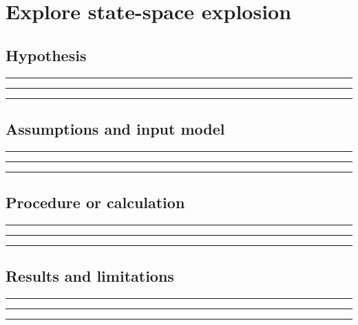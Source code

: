 \documentclass[11pt]{article}
\begin{document}
\section{Explore state-space explosion}

\subsection{Hypothesis}
\noindent\rule{\linewidth}{0.35pt}\par\vspace{0.22in}
\noindent\rule{\linewidth}{0.35pt}\par\vspace{0.22in}
\noindent\rule{\linewidth}{0.35pt}\par\vspace{0.18in}

\subsection{Assumptions and input model}
\noindent\rule{\linewidth}{0.35pt}\par\vspace{0.22in}
\noindent\rule{\linewidth}{0.35pt}\par\vspace{0.22in}
\noindent\rule{\linewidth}{0.35pt}\par\vspace{0.18in}

\subsection{Procedure or calculation}
\noindent\rule{\linewidth}{0.35pt}\par\vspace{0.22in}
\noindent\rule{\linewidth}{0.35pt}\par\vspace{0.22in}
\noindent\rule{\linewidth}{0.35pt}\par\vspace{0.18in}

\subsection{Results and limitations}
\noindent\rule{\linewidth}{0.35pt}\par\vspace{0.22in}
\noindent\rule{\linewidth}{0.35pt}\par\vspace{0.22in}
\noindent\rule{\linewidth}{0.35pt}\par\vspace{0.18in}
\end{document}
